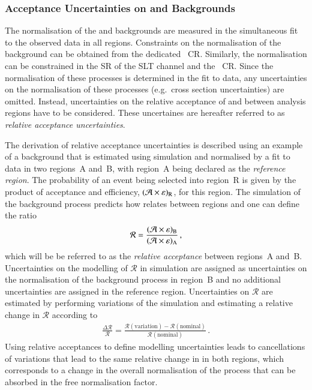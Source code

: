 \subsubsection{Acceptance Uncertainties on \ZHF and \ttbar Backgrounds}

The normalisation of the \ZHF and \ttbar backgrounds are measured in the
simultaneous fit to the observed data in all regions. Constraints on the
normalisation of the \ZHF background can be obtained from the dedicated
\ZHF~CR. Similarly, the \ttbar normalisation can be constrained in the SR of the
\lephad SLT channel and the \ZHF~CR. Since the normalisation of these processes
is determined in the fit to data, any uncertainties on the normalisation of
these processes (e.g.~cross section uncertainties) are omitted. Instead,
uncertainties on the relative acceptance of \ZHF and \ttbar between analysis
regions have to be considered. These uncertaines are hereafter referred to as
\emph{relative acceptance uncertainties}.

The derivation of relative acceptance uncertainties is described using an
example of a background that is estimated using simulation and normalised by a
fit to data in two regions~A and~B, with region~A being declared as the
\emph{reference region}. The probability of an event being selected into
region~R is given by the product of acceptance and efficiency,
$(\mathcal{A} \times \varepsilon)_{\text{R}}$, for this region. The simulation of the background
process predicts how \AccTimesEff relates between regions and one can define the
ratio
\begin{align*}
  \mathcal{R} = \frac{(\mathcal{A} \times \varepsilon)_{\text{B}}}{(\mathcal{A} \times \varepsilon)_{\text{A}}} \,\text{,}
\end{align*}
which will be be referred to as the \emph{relative acceptance} between regions~A
and~B. Uncertainties on the modelling of $\mathcal{R}$ in simulation are
assigned as uncertainties on the normalisation of the background process in
region~B and no additional uncertainties are assigned in the reference
region. Uncertainties on $\mathcal{R}$ are estimated by performing variations of
the simulation and estimating a relative change in $\mathcal{R}$ according to
\begin{align}
  \frac{\Delta \mathcal{R}}{\mathcal{R}} = \frac{\mathcal{R}(\text{variation}) - \mathcal{R}(\text{nominal})}{\mathcal{R}(\text{nominal})} \,\text{.}
  \label{eq:relative_acceptance_uncertainty}
\end{align}
Using relative acceptances to define modelling uncertainties leads to
cancellations of variations that lead to the same relative change in
\AccTimesEff in both regions, which corresponds to a change in the overall
normalisation of the process that can be absorbed in the free normalisation
factor.

